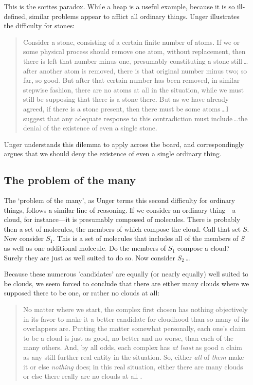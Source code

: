 \documentclass[11pt]{standalone} \newif\ifstandlone \standalonetrue
\newenvironment{squote}{%
	\begin{quote}\begin{singlespace}%
	}{%
	\end{singlespace}\end{quote}}
\begin{document}
\begin{spacing}{1.5}
This is the sorites paradox.  While a heap is a useful example,
because it is so ill-defined, similar problems appear to afflict all
ordinary things.  Unger illustrates the difficulty for stones:

\begin{squote}
Consider a stone, consisting of a certain finite number of atoms.  If
we or some physical process should remove one atom, without
replacement, then there is left that number minus one, presumably
constituting a stone still\,\ldots after another atom is removed,
there is that original number minus two; so far, so good.  But after
that certain number has been removed, in similar stepwise fashion,
there are no atoms at all in the situation, while we must still be
supposing that there is a stone there.  But as we have already agreed,
if there is a stone present, then there must be some atoms\,\ldots I
suggest that any adequate response to this contradiction must
include\,\ldots the denial of the existence of even a single
stone.~\citep[121--122]{unger1979}
\end{squote}
Unger understands this dilemma to apply across the board, and
correspondingly argues that we should deny the existence of even a
single ordinary thing.

\subsection{The problem of the many}
\label{many}
The `problem of the many', as Unger terms this second difficulty for
ordinary things, follows a similar line of reasoning.  If we consider
an ordinary thing---a cloud, for instance---it is presumably composed
of molecules.  There is probably then a set of molecules, the members
of which compose the cloud.  Call that set $S$.  Now consider $S_1$.
This is a set of molecules that includes all of the members of $S$ as
well as one additional molecule.  Do the members of $S_1$ compose a
cloud?  Surely they are just as well suited to do so.  Now consider
$S_2$\,\ldots

Because these numerous 'candidates' are equally (or nearly equally)
well suited to be clouds, we seem forced to conclude that there are
either many clouds where we supposed there to be one, or rather no
clouds at all:

\begin{squote}
No matter where we start, the complex first chosen has nothing
objectively in its favor to make it a better candidate for cloudhood
than so many of its overlappers are.  Putting the matter somewhat
personally, each one's claim to be a cloud is just as good, no better
and no worse, than each of the many others.  And, by all odds, each
complex has \emph{at least} as good a claim as any still further real
entity in the situation.  So, either \emph{all} of \emph{them} make it
or else \emph{nothing} does; in this real situation, either there are
many clouds or else there really are no clouds at all
\citep[415--??]{unger1980a}.
\end{squote}


\end{spacing}
\end{document}
